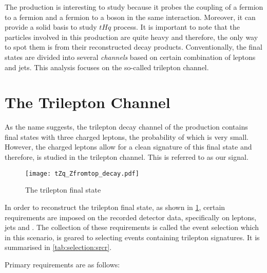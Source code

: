 The \tZq production is interesting to study because it probes the coupling
of a fermion to a fermion and a fermion to a boson in the same interaction. Moreover, 
it can provide a solid basis to study $tHq$ process. It is important to note 
that the particles involved in this production are quite heavy and therefore,
the only way to spot them is from their reconstructed decay products. 
Conventionally, the final states are divided into several \textit{channels}
based on certain combination of leptons and jets. This analysis focuses on
the so-called trilepton channel.

\section{The \tZqsec Trilepton Channel}
As the name suggests, the trilepton decay channel of the \tZq production 
contains final states with three charged leptons, the probability of which
is very small. However, the charged leptons allow for a clean signature
of this final state and therefore, \tZq is studied in the trilepton channel. This
is referred to as our signal.

\begin{figure}
  \centering
      \texttt{[image: tZq\_Zfromtop\_decay.pdf]}
      \caption{The \tZq trilepton final state}
         \label{fig:tZqtrilep}
\end{figure}

In order to reconstruct the trilepton final state, as shown in \cref{fig:tZqtrilep}, certain 
requirements are imposed on the recorded detector data, specifically on leptons, jets and
. The collection of these requirements is called the event selection
which in this scenario, is geared to selecting events containing \tZq trilepton 
signatures. It is summarised in \cref{tab:selection:srcr}.

Primary requirements are as follows:

